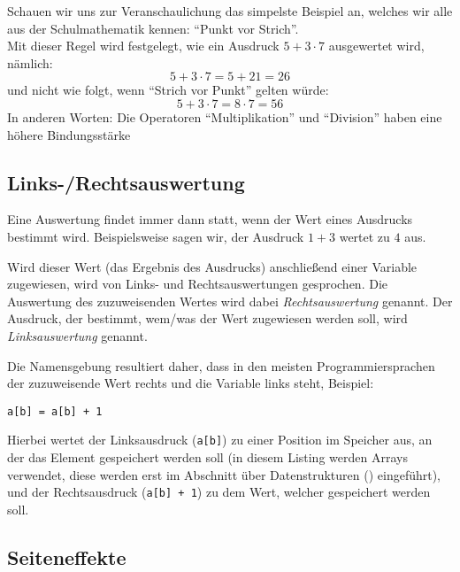 		Schauen wir uns zur Veranschaulichung das simpelste Beispiel an, welches wir alle aus der Schulmathematik kennen: \enquote{Punkt vor Strich}. \\
		Mit dieser Regel wird festgelegt, wie ein Ausdruck $ 5 + 3 \cdot 7 $ ausgewertet wird, nämlich:
		\begin{equation*}
			5 + 3 \cdot 7 = 5 + 21 = 26
		\end{equation*}
		und nicht wie folgt, wenn \enquote{Strich vor Punkt} gelten würde:
		\begin{equation*}
			5 + 3 \cdot 7 = 8 \cdot 7 = 56
		\end{equation*}
		In anderen Worten: Die Operatoren \enquote{Multiplikation} und \enquote{Division} haben eine höhere Bindungsstärke

\subsection{Links-/Rechtsauswertung} \imperativeMark \oopMark
	
	Eine Auswertung findet immer dann statt, wenn der Wert eines Ausdrucks bestimmt wird. Beispielsweise sagen wir, der Ausdruck $ 1 + 3 $ wertet zu $ 4 $ aus.
	
	Wird dieser Wert (das Ergebnis des Ausdrucks) anschließend einer Variable zugewiesen, wird von Links- und Rechtsauswertungen gesprochen. Die Auswertung des zuzuweisenden Wertes wird dabei \textit{Rechtsauswertung} genannt. Der Ausdruck, der bestimmt, wem/was der Wert zugewiesen werden soll, wird \textit{Linksauswertung} genannt.
	
	Die Namensgebung resultiert daher, dass in den meisten Programmiersprachen der zuzuweisende Wert rechts und die Variable links steht, Beispiel:
	\begin{lstlisting}
a[b] = a[b] + 1
	\end{lstlisting}
	Hierbei wertet der Linksausdruck (\texttt{a[b]}) zu einer Position im Speicher aus, an der das Element gespeichert werden soll (in diesem Listing werden Arrays verwendet, diese werden erst im Abschnitt über Datenstrukturen () eingeführt), und der Rechtsausdruck (\texttt{a[b] + 1}) zu dem Wert, welcher gespeichert werden soll.

\subsection{Seiteneffekte} \imperativeMark \oopMark
	
